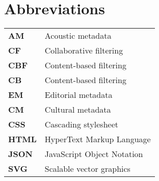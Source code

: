\chapter*{Abbreviations}\label{chapter:abbreviations}

\begin{table}%
	\begin{tabular}{ l l}
	\textbf{AM}					&	Acoustic metadata							\\
	\textbf{CF}					& Collaborative filtering				\\
	\textbf{CBF}				& Content-based filtering				\\
	\textbf{CB}					& Content-based filtering				\\
	\textbf{EM}					&	Editorial metadata						\\
	\textbf{CM}					&	Cultural metadata							\\
	\textbf{CSS}				& Cascading stylesheet					\\
	\textbf{HTML}				& HyperText Markup Language 		\\
	\textbf{JSON}				& JavaScript Object Notation		\\
	\textbf{SVG} 				& Scalable vector graphics 			\\
	\end{tabular}
	\label{table:abbreviations}
\end{table}